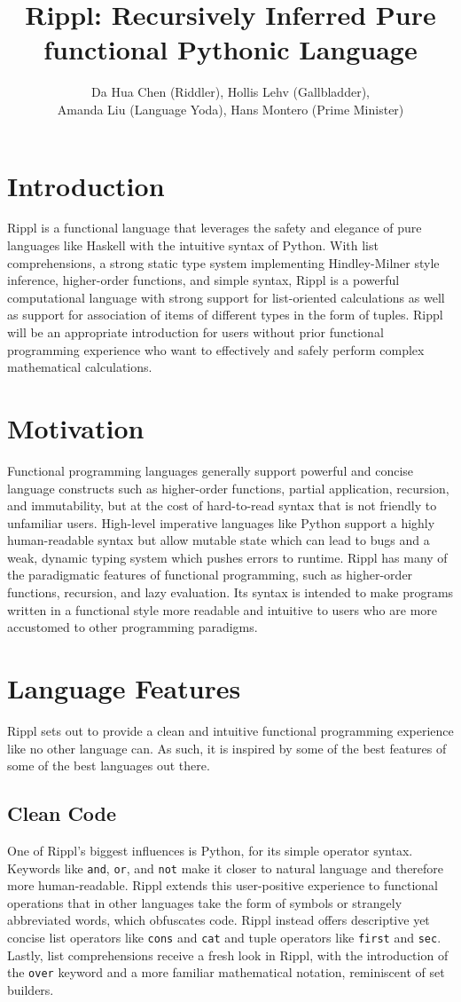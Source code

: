 ﻿\documentclass[5pt]{article}
\title{Rippl: Recursively Inferred Pure functional Pythonic Language}
\author{Da Hua Chen (Riddler), Hollis Lehv (Gallbladder),\\Amanda Liu (Language Yoda), Hans Montero (Prime Minister)}
\date{}
\begin{document}
\maketitle

\section{Introduction}
Rippl is a functional language that leverages the safety and elegance of pure languages like Haskell with the intuitive syntax of Python. With list comprehensions, a strong static type system implementing Hindley-Milner style inference, higher-order functions, and simple syntax, Rippl is a powerful computational language with strong support for list-oriented calculations as well as support for association of items of different types in the form of tuples. Rippl will be an appropriate introduction for users without prior functional programming experience who want to effectively and safely perform complex mathematical calculations.


\section{Motivation}
Functional programming languages generally support powerful and concise language constructs such as higher-order functions, partial application, recursion, and immutability, but at the cost of hard-to-read syntax that is not friendly to unfamiliar users. High-level imperative languages like Python support a highly human-readable syntax but allow mutable state which can lead to bugs and a weak, dynamic typing system which pushes errors to runtime. Rippl has many of the paradigmatic features of functional programming, such as higher-order functions, recursion, and lazy evaluation. Its syntax is intended to make programs written in a functional style more readable and intuitive to users who are more accustomed  to other programming paradigms.

\pagebreak

\section{Language Features}
Rippl sets out to provide a clean and intuitive functional programming experience like no other language can. As such, it is inspired by some of the best features of some of the best languages out there.
\subsection{Clean Code}
One of Rippl’s biggest influences is Python, for its simple operator syntax.
Keywords like \texttt{and}, \texttt{or}, and \texttt{not} make it closer to
natural language and therefore more human-readable. Rippl extends this
user-positive experience to functional operations that in other languages take
the form of symbols or strangely abbreviated words, which obfuscates code. Rippl instead offers descriptive yet concise list operators like \texttt{cons} and
\texttt{cat} and tuple operators like \texttt{first} and \texttt{sec}. Lastly,
list comprehensions receive a fresh look in Rippl, with the introduction of the
\texttt{over} keyword and a more familiar mathematical notation, reminiscent of set builders.
\end{document}
